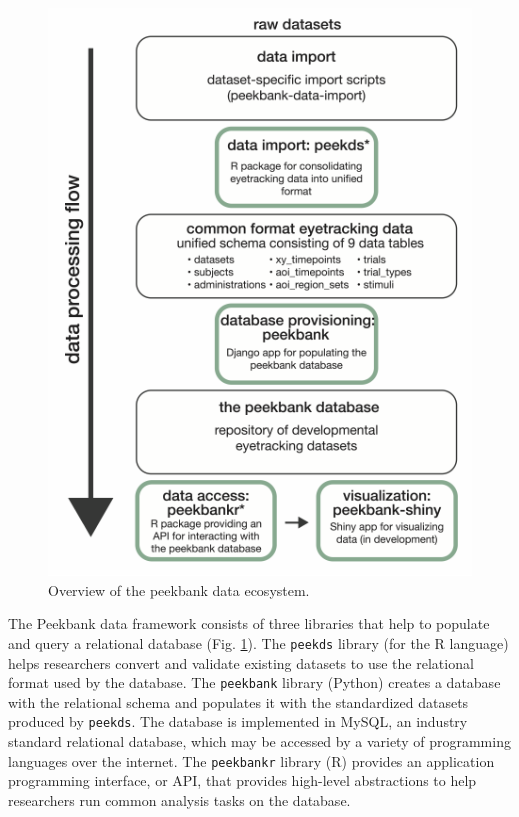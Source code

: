 \documentclass[10pt, letterpaper]{article}
\newenvironment{CodeChunk}{}{}
\begin{document}
\begin{CodeChunk}
\begin{figure}[tb]

{\centering \includegraphics{figs/fig_framework_overview-1} 

}

\caption[Overview of the peekbank data ecosystem]{Overview of the peekbank data ecosystem.}\label{fig:fig_framework_overview}
\end{figure}
\end{CodeChunk}

The Peekbank data framework consists of three libraries that help to
populate and query a relational database (Fig.
\ref{fig:fig_framework_overview}). The \texttt{peekds} library (for the
R language) helps researchers convert and validate existing datasets to
use the relational format used by the database. The \texttt{peekbank}
library (Python) creates a database with the relational schema and
populates it with the standardized datasets produced by \texttt{peekds}.
The database is implemented in MySQL, an industry standard relational
database, which may be accessed by a variety of programming languages
over the internet. The \texttt{peekbankr} library (R) provides an
application programming interface, or API, that provides high-level
abstractions to help researchers run common analysis tasks on the
database.
\end{document}
